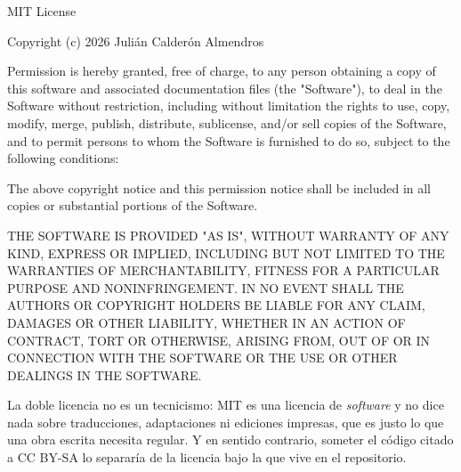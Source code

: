 \begin{lean}
MIT License

Copyright (c) 2026 Julián Calderón Almendros

Permission is hereby granted, free of charge, to any person obtaining a copy
of this software and associated documentation files (the "Software"), to deal
in the Software without restriction, including without limitation the rights
to use, copy, modify, merge, publish, distribute, sublicense, and/or sell
copies of the Software, and to permit persons to whom the Software is
furnished to do so, subject to the following conditions:

The above copyright notice and this permission notice shall be included in all
copies or substantial portions of the Software.

THE SOFTWARE IS PROVIDED "AS IS", WITHOUT WARRANTY OF ANY KIND, EXPRESS OR
IMPLIED, INCLUDING BUT NOT LIMITED TO THE WARRANTIES OF MERCHANTABILITY,
FITNESS FOR A PARTICULAR PURPOSE AND NONINFRINGEMENT. IN NO EVENT SHALL THE
AUTHORS OR COPYRIGHT HOLDERS BE LIABLE FOR ANY CLAIM, DAMAGES OR OTHER
LIABILITY, WHETHER IN AN ACTION OF CONTRACT, TORT OR OTHERWISE, ARISING FROM,
OUT OF OR IN CONNECTION WITH THE SOFTWARE OR THE USE OR OTHER DEALINGS IN THE
SOFTWARE.
\end{lean}

\begin{observacion}
La doble licencia no es un tecnicismo: MIT es una licencia de \emph{software} y no dice nada sobre
traducciones, adaptaciones ni ediciones impresas, que es justo lo que una obra escrita necesita
regular. Y en sentido contrario, someter el código citado a CC BY-SA lo separaría de la licencia
bajo la que vive en el repositorio.
\end{observacion}
